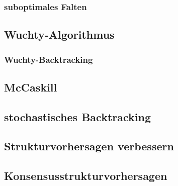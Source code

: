 \documentclass[12pt]{article}
\begin{document}
\subsubsection{suboptimales Falten}

\subsection{Wuchty-Algorithmus}

\subsubsection{Wuchty-Backtracking}

\subsection{McCaskill}

\subsection{stochastisches Backtracking}

\subsection{Strukturvorhersagen verbessern}

\subsection{Konsensusstrukturvorhersagen}
\end{document}
